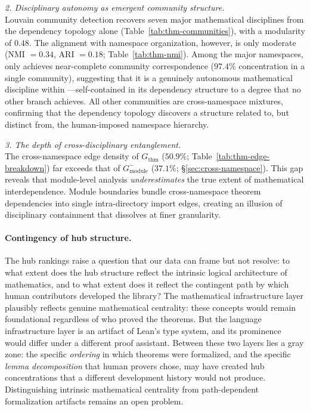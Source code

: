 \medskip
\noindent\textit{2. Disciplinary autonomy as emergent community structure.}\\
Louvain community detection recovers seven major mathematical disciplines from the dependency topology alone (Table~\ref{tab:thm-communities}), with a modularity of $0.48$. The alignment with namespace organization, however, is only moderate (NMI $= 0.34$, ARI $= 0.18$; Table~\ref{tab:thm-nmi}). Among the major namespaces, only  achieves near-complete community correspondence ($97.4\%$ concentration in a single community), suggesting that it is a genuinely autonomous mathematical discipline within ---self-contained in its dependency structure to a degree that no other branch achieves. All other communities are cross-namespace mixtures, confirming that the dependency topology discovers a structure related to, but distinct from, the human-imposed namespace hierarchy.

\medskip
\noindent\textit{3. The depth of cross-disciplinary entanglement.}\\
The cross-namespace edge density of $G_{\mathrm{thm}}$ ($50.9\%$; Table~\ref{tab:thm-edge-breakdown}) far exceeds that of $G_{\mathrm{module}}^{-}$ ($37.1\%$; \S\ref{sec:cross-namespace}). This gap reveals that module-level analysis \emph{underestimates} the true extent of mathematical interdependence. Module boundaries bundle cross-namespace theorem dependencies into single intra-directory import edges, creating an illusion of disciplinary containment that dissolves at finer granularity.

\paragraph{Contingency of hub structure.}
The hub rankings raise a question that our data can frame but not resolve: to what extent does the hub structure reflect the intrinsic logical architecture of mathematics, and to what extent does it reflect the contingent path by which human contributors developed the library? The mathematical infrastructure layer plausibly reflects genuine mathematical centrality: these concepts would remain foundational regardless of who proved the theorems. But the language infrastructure layer is an artifact of Lean's type system, and its prominence would differ under a different proof assistant. Between these two layers lies a gray zone: the specific \emph{ordering} in which theorems were formalized, and the specific \emph{lemma decomposition} that human provers chose, may have created hub concentrations that a different development history would not produce. Distinguishing intrinsic mathematical centrality from path-dependent formalization artifacts remains an open problem.

